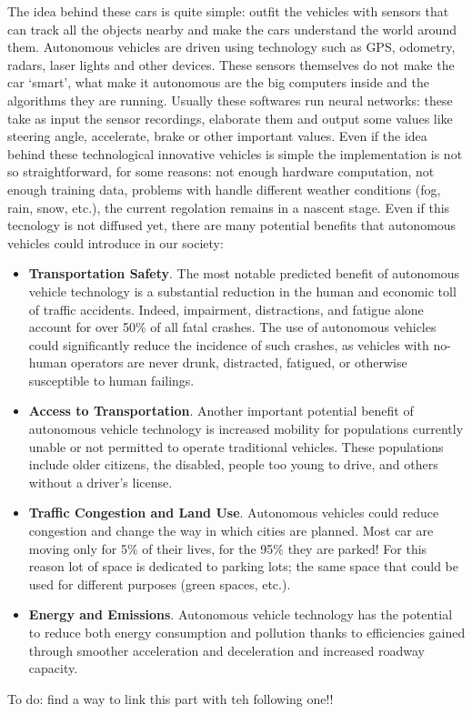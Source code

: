 \documentclass[14pt]{extarticle}
\def\ss{\vspace{25pt}}
\def\pp{\vspace{10pt}\newline}
\def\ppn{\vspace{10pt}}
\begin{document}
\begin{flushleft}
\ppn
The idea behind these cars is quite simple: outfit the vehicles with sensors that can track all the objects nearby and make the cars understand the world around them. Autonomous vehicles are driven using technology such as GPS, odometry, radars, laser lights and other devices\cite{AVlevels2}. These sensors themselves do not make the car ‘smart’, what make it autonomous are the big computers inside and the algorithms they are running. Usually these softwares run neural networks: these take as input the sensor recordings, elaborate them and output some values like steering angle, accelerate, brake or other important values. Even if the idea behind these technological innovative vehicles is simple the implementation is not so straightforward, for some reasons: not enough hardware computation, not enough training data, problems with handle different weather conditions (fog, rain, snow, etc.),  the current regolation remains in a nascent stage.
 \pp
Even if this tecnology is not diffused yet, there are many potential benefits that autonomous vehicles could introduce in our society:
 \begin{itemize}
 \item \textbf{Transportation Safety}. The most notable predicted benefit of autonomous vehicle technology is a substantial reduction in the human and economic toll of traffic accidents. Indeed, impairment, distractions, and fatigue alone account for over 50\% of all fatal crashes. The use of autonomous vehicles could significantly reduce the incidence of such crashes, as vehicles with no-human operators are never drunk, distracted, fatigued, or otherwise susceptible to human failings.
\item \textbf{Access to Transportation}. Another important potential benefit of autonomous vehicle technology is increased mobility for populations currently unable or not permitted to operate traditional vehicles. These populations include older
citizens, the disabled, people too young to drive, and others without a driver’s 
license.
\item \textbf{Traffic Congestion and Land Use}. Autonomous vehicles could reduce congestion and change the way in which cities are planned. Most car are moving only for 5\% of their lives, for the 95\% they are parked\cite{AVparking}! For this reason lot of space is dedicated to parking lots; the same space that could be used for different purposes (green spaces, etc.).
\item \textbf{Energy and Emissions}. Autonomous vehicle technology has the potential to reduce both energy consumption and pollution thanks to efficiencies gained through smoother acceleration and deceleration and  increased  roadway capacity.\cite{AVbenefit}
 \end{itemize}
 
 To do: find a way to link this part with teh following one!!

	\ss
\end{flushleft}
\end{document}

